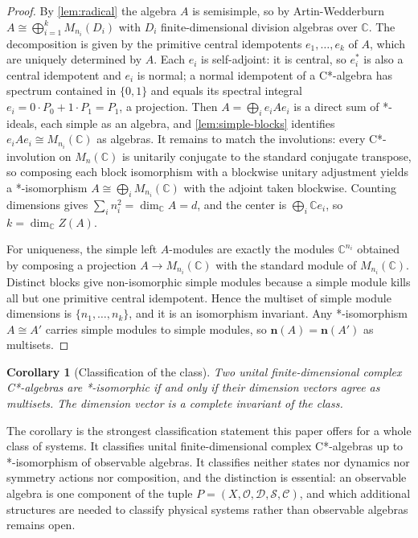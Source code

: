 \documentclass[11pt,letterpaper]{article}
\newtheorem{corollary}[theorem]{Corollary}
\theoremstyle{definition}
\theoremstyle{remark}
\begin{document}
\begin{proof}
By \cref{lem:radical} the algebra $A$ is semisimple, so by Artin-Wedderburn $A \cong \bigoplus_{i=1}^{k} M_{n_i}(D_i)$ with $D_i$ finite-dimensional division algebras over $\mathbb{C}$. The decomposition is given by the primitive central idempotents $e_1, \dots, e_k$ of $A$, which are uniquely determined by $A$. Each $e_i$ is self-adjoint: it is central, so $e_i^*$ is also a central idempotent and $e_i$ is normal; a normal idempotent of a C*-algebra has spectrum contained in $\{0, 1\}$ and equals its spectral integral $e_i = 0 \cdot P_0 + 1 \cdot P_1 = P_1$, a projection. Then $A = \bigoplus_i e_i A e_i$ is a direct sum of *-ideals, each simple as an algebra, and \cref{lem:simple-blocks} identifies $e_i A e_i \cong M_{n_i}(\mathbb{C})$ as algebras. It remains to match the involutions: every C*-involution on $M_n(\mathbb{C})$ is unitarily conjugate to the standard conjugate transpose, so composing each block isomorphism with a blockwise unitary adjustment yields a *-isomorphism $A \cong \bigoplus_i M_{n_i}(\mathbb{C})$ with the adjoint taken blockwise. Counting dimensions gives $\sum_i n_i^2 = \dim_{\mathbb{C}} A = d$, and the center is $\bigoplus_i \mathbb{C} e_i$, so $k = \dim_{\mathbb{C}} Z(A)$.

For uniqueness, the simple left $A$-modules are exactly the modules $\mathbb{C}^{n_i}$ obtained by composing a projection $A \to M_{n_i}(\mathbb{C})$ with the standard module of $M_{n_i}(\mathbb{C})$. Distinct blocks give non-isomorphic simple modules because a simple module kills all but one primitive central idempotent. Hence the multiset of simple module dimensions is $\{n_1, \dots, n_k\}$, and it is an isomorphism invariant. Any *-isomorphism $A \cong A'$ carries simple modules to simple modules, so $\mathbf{n}(A) = \mathbf{n}(A')$ as multisets.
\end{proof}

\begin{corollary}[Classification of the class]
\label{cor:classification}
Two unital finite-dimensional complex C*-algebras are *-isomorphic if and only if their dimension vectors agree as multisets. The dimension vector is a complete invariant of the class.
\end{corollary}

The corollary is the strongest classification statement this paper offers for a whole class of systems. It classifies unital finite-dimensional complex C*-algebras up to *-isomorphism of observable algebras. It classifies neither states nor dynamics nor symmetry actions nor composition, and the distinction is essential: an observable algebra is one component of the tuple $P = (X, \mathcal{O}, \mathcal{D}, \mathcal{S}, \mathcal{C})$, and which additional structures are needed to classify physical systems rather than observable algebras remains open.
\end{document}
